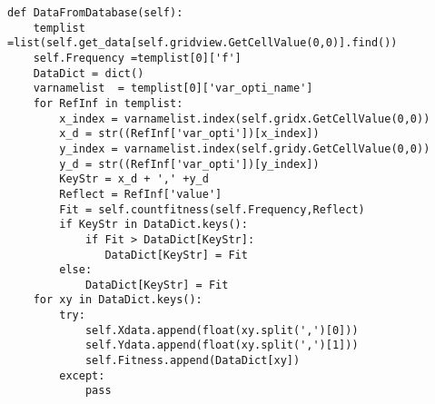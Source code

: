 
\newpage






\begin{lstlisting}
def DataFromDatabase(self):
    templist =list(self.get_data[self.gridview.GetCellValue(0,0)].find())
    self.Frequency =templist[0]['f']
    DataDict = dict()
    varnamelist  = templist[0]['var_opti_name']
    for RefInf in templist:
        x_index = varnamelist.index(self.gridx.GetCellValue(0,0))
        x_d = str((RefInf['var_opti'])[x_index])
        y_index = varnamelist.index(self.gridy.GetCellValue(0,0))
        y_d = str((RefInf['var_opti'])[y_index])
        KeyStr = x_d + ',' +y_d
        Reflect = RefInf['value']      
        Fit = self.countfitness(self.Frequency,Reflect)
        if KeyStr in DataDict.keys():
            if Fit > DataDict[KeyStr]:
               DataDict[KeyStr] = Fit
        else:
            DataDict[KeyStr] = Fit
    for xy in DataDict.keys():
        try:
            self.Xdata.append(float(xy.split(',')[0]))
            self.Ydata.append(float(xy.split(',')[1]))
            self.Fitness.append(DataDict[xy])
        except:
            pass
\end{lstlisting}




